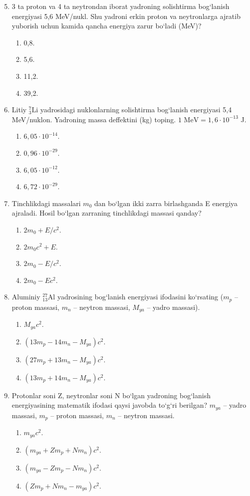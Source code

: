 \begin{enumerate}
\setcounter{enumi}{4}
\item 3 ta proton va 4 ta neytrondan iborat yadroning solishtirma bog‘lanish energiyasi 5,6 MeV/nukl. Shu yadroni erkin proton va neytronlarga ajratib yuborish uchun kamida qancha energiya zarur bo‘ladi (MeV)?
\begin{enumerate}[label=\Alph*)]
\item 0,8.
\item 5,6.
\item 11,2.
\item 39,2.
\end{enumerate}

\item Litiy $^7_3\text{Li}$ yadrosidagi nuklonlarning solishtirma bog‘lanish energiyasi 5,4 MeV/nuklon. Yadroning massa deffektini (kg) toping. $1\text{ MeV} = 1,6\cdot 10^{-13}$ J.
\begin{enumerate}[label=\Alph*)]
\item $6,05\cdot 10^{-14}$.
\item $0,96\cdot 10^{-29}$.
\item $6,05\cdot 10^{-12}$.
\item $6,72\cdot 10^{-29}$.
\end{enumerate}

\item Tinchlikdagi massalari $m_0$ dan bo‘lgan ikki zarra birlashganda E energiya ajraladi. Hosil bo‘lgan zarraning tinchlikdagi massasi qanday?
\begin{enumerate}[label=\Alph*)]
\item $2m_0 + E/c^2$.
\item $2m_0c^2 + E$.
\item $2m_0 - E/c^2$.
\item $2m_0 - Ec^2$.
\end{enumerate}

\item Aluminiy $^{27}_{13}\text{Al}$ yadrosining bog‘lanish energiyasi ifodasini ko‘rsating ($m_p$ -- proton massasi, $m_n$ -- neytron massasi, $M_{ya}$ -- yadro massasi).
\begin{enumerate}[label=\Alph*)]
\item $M_{ya}c^2$.
\item $(13m_p - 14m_n - M_{ya})c^2$.
\item $(27m_p + 13m_n - M_{ya})c^2$.
\item $(13m_p + 14m_n - M_{ya})c^2$.
\end{enumerate}

\item Protonlar soni Z, neytronlar soni N bo‘lgan yadroning bog‘lanish energiyasining matematik ifodasi qaysi javobda to‘g‘ri berilgan? $m_{ya}$ -- yadro massasi, $m_p$ -- proton massasi, $m_n$ -- neytron massasi.
\begin{enumerate}[label=\Alph*)]
\item $m_{ya}c^2$.
\item $(m_{ya} + Zm_p + Nm_n)c^2$.
\item $(m_{ya} - Zm_p - Nm_n)c^2$.
\item $(Zm_p + Nm_n - m_{ya})c^2$.
\end{enumerate}


\end{enumerate}

